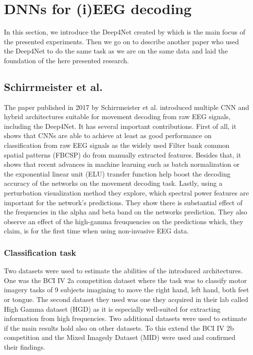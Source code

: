\section{DNNs for (i)EEG decoding}\label{sec:dnn-decoding}
In this section, we introduce the Deep4Net created by \cite{schirrmeister-deep-2017} which is the main focus of the presented experiments.
Then we go on to describe another paper \cite{Hammer-2021} who used the Deep4Net to do the same task as we are on the same data and laid the foundation of the here presented research.

\subsection{Schirrmeister et al.}
The paper \cite{schirrmeister-deep-2017} published in 2017 by Schirrmeister et al. introduced multiple CNN and hybrid architectures suitable for movement decoding from raw EEG signals, including the Deep4Net.
It has several important contributions.
First of all, it shows that CNNs are able to achieve at least as good performance on classification from raw EEG signals as the widely used Filter bank common spatial patterns (FBCSP) do from manually extracted features. Besides that, it shows that recent advances in machine learning such as batch normalization or the exponential linear unit (ELU) transfer function help boost the decoding accuracy of the networks on the movement decoding task.
Lastly, using a perturbation visualization method they explore, which spectral power features are important for the network's predictions.
They show there is substantial effect of the frequencies in the alpha and beta band on the networks prediction.
They also observe an effect of the high-gamma freuquencies on the predictions which, they claim, is for the first time when using non-invasive EEG data.\\

\subsubsection{Classification task}
Two datasets were used to estimate the abilities of the introduced architectures.
One was the BCI IV 2a competition dataset \cite{brunner2008bci} where the task was to classify motor imagery tasks of 9 subjects imagining to move the right hand, left hand, both feet or tongue.
The second dataset they used was one they acquired in their lab called High Gamma dataset (HGD) as it is especially well-suited for extracting information from high frequencies.
Two additional datasets were used to estimate if the main results hold also on other datasets. 
To this extend the BCI IV 2b competition and the Mixed Imagedy Dataset (MID) were used and confirmed their findings.


